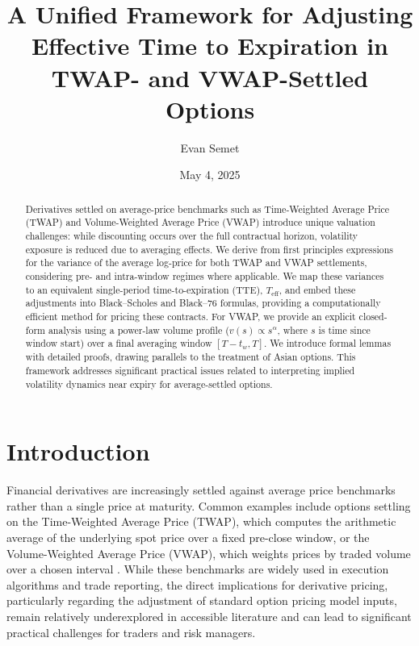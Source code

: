 \documentclass[11pt]{article}
\title{A Unified Framework for Adjusting Effective Time to Expiration in TWAP- and VWAP-Settled Options}
\author{Evan Semet}
\date{May 4, 2025}
\theoremstyle{plain}
\begin{document}
\maketitle

\begin{abstract}
Derivatives settled on average-price benchmarks such as Time-Weighted Average Price (TWAP) and Volume-Weighted Average Price (VWAP) introduce unique valuation challenges: while discounting occurs over the full contractual horizon, volatility exposure is reduced due to averaging effects. We derive from first principles expressions for the variance of the average log-price for both TWAP and VWAP settlements, considering pre- and intra-window regimes where applicable. We map these variances to an equivalent single-period time-to-expiration (TTE), $T_{\mathrm{eff}}$, and embed these adjustments into Black–Scholes and Black–76 formulas, providing a computationally efficient method for pricing these contracts. For VWAP, we provide an explicit closed-form analysis using a power-law volume profile ($v(s) \propto s^\alpha$, where $s$ is time since window start) over a final averaging window $[T-t_w, T]$. We introduce formal lemmas with detailed proofs, drawing parallels to the treatment of Asian options. This framework addresses significant practical issues related to interpreting implied volatility dynamics near expiry for average-settled options.
\end{abstract}

\section{Introduction}
\label{sec:introduction}

Financial derivatives are increasingly settled against average price benchmarks rather than a single price at maturity. Common examples include options settling on the Time-Weighted Average Price (TWAP), which computes the arithmetic average of the underlying spot price over a fixed pre-close window, or the Volume-Weighted Average Price (VWAP), which weights prices by traded volume over a chosen interval \citep[see e.g.,][for benchmark definitions]{kissell2013science}. While these benchmarks are widely used in execution algorithms and trade reporting, the direct implications for derivative pricing, particularly regarding the adjustment of standard option pricing model inputs, remain relatively underexplored in accessible literature and can lead to significant practical challenges for traders and risk managers.
\end{document}
